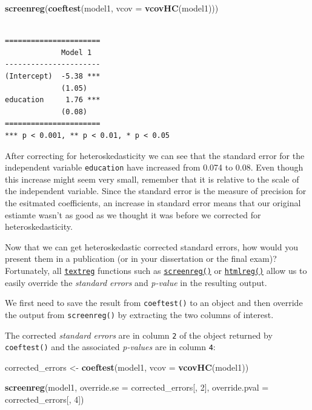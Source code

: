 \documentclass[]{article}
\newenvironment{Shaded}{\begin{snugshade}}{\end{snugshade}}
\newcommand{\KeywordTok}[1]{\textcolor[rgb]{0.13,0.29,0.53}{\textbf{#1}}}
\newcommand{\DataTypeTok}[1]{\textcolor[rgb]{0.13,0.29,0.53}{#1}}
\newcommand{\DecValTok}[1]{\textcolor[rgb]{0.00,0.00,0.81}{#1}}
\newcommand{\StringTok}[1]{\textcolor[rgb]{0.31,0.60,0.02}{#1}}
\newcommand{\NormalTok}[1]{#1}
\theoremstyle{definition}
\theoremstyle{definition}
\theoremstyle{definition}
\theoremstyle{remark}
\begin{document}
\begin{Shaded}
\begin{Highlighting}[]
\KeywordTok{screenreg}\NormalTok{(}\KeywordTok{coeftest}\NormalTok{(model1, }\DataTypeTok{vcov =} \KeywordTok{vcovHC}\NormalTok{(model1)))}
\end{Highlighting}
\end{Shaded}

\begin{verbatim}

======================
             Model 1  
----------------------
(Intercept)  -5.38 ***
             (1.05)   
education     1.76 ***
             (0.08)   
======================
*** p < 0.001, ** p < 0.01, * p < 0.05
\end{verbatim}

After correcting for heteroskedasticity we can see that the standard
error for the independent variable \texttt{education} have increased
from 0.074 to 0.08. Even though this increase might seem very small,
remember that it is relative to the scale of the independent variable.
Since the standard error is the measure of precision for the esitmated
coefficients, an increase in standard error means that our original
estiamte wasn't as good as we thought it was before we corrected for
heteroskedasticity.

Now that we can get heteroskedastic corrected standard errors, how would
you present them in a publication (or in your dissertation or the final
exam)? Fortunately, all \href{http://bit.ly/R_texreg}{\texttt{textreg}}
functions such as \href{http://bit.ly/R_screenreg}{\texttt{screenreg()}}
or \href{http://bit.ly/R_htmlreg}{\texttt{htmlreg()}} allow us to easily
override the \emph{standard errors} and \emph{p-value} in the resulting
output.

We first need to save the result from \texttt{coeftest()} to an object
and then override the output from \texttt{screenreg()} by extracting the
two columns of interest.

The corrected \emph{standard errors} are in column \texttt{2} of the
object returned by \texttt{coeftest()} and the associated
\emph{p-values} are in column \texttt{4}:

\begin{Shaded}
\begin{Highlighting}[]
\NormalTok{corrected_errors <-}\StringTok{ }\KeywordTok{coeftest}\NormalTok{(model1, }\DataTypeTok{vcov =} \KeywordTok{vcovHC}\NormalTok{(model1)) }

\KeywordTok{screenreg}\NormalTok{(model1, }
          \DataTypeTok{override.se =}\NormalTok{ corrected_errors[, }\DecValTok{2}\NormalTok{], }
          \DataTypeTok{override.pval =}\NormalTok{ corrected_errors[, }\DecValTok{4}\NormalTok{])}
\end{Highlighting}
\end{Shaded}
\end{document}

